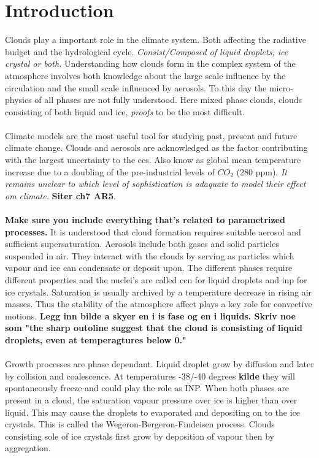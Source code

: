 \chapter{Introduction} \label{ch:introduction}
Clouds play a important role in the climate system. Both affecting the radiative budget and the hydrological cycle. \textit{Consist/Composed of liquid droplets, ice crystal or both.} Understanding how clouds form in the complex system of the atmosphere involves both knowledge about the large scale influence by the circulation and the small scale influenced by aerosols. To this day the micro-physics of all phases are not fully understood. Here mixed phase clouds, clouds consisting of both liquid and ice, \textit{proofs} to be the most difficult. 
\\ \\ 
Climate models are the most useful tool for studying past, present and future climate change. Clouds and aerosols are acknowledged as the factor contributing with the largest uncertainty to the \acrfull{ecs}. Also know as global mean temperature increase due to a doubling of the pre-industrial levels of $CO_2$ (280 \acrshort{ppm}). \textit{It remains unclear to which level of sophistication is adaquate to model their effect om climate.} \textbf{Siter ch7 AR5}.
\\ \\
\textbf{Make sure you include everything that's related to parametrized processes.} It is understood that cloud formation requires suitable aerosol and sufficient supersaturation. Aerosols include both gases and solid particles suspended in air. They interact with the clouds by serving as particles which vapour and ice can condensate or deposit upon. The different phases require different properties and the nuclei's are called \acrshort{ccn} for liquid droplets and \acrshort{inp} for ice crystals. Saturation is usually archived by a temperature decrease in rising air masses. Thus the stability of the atmosphere affect plays a key role for convective motions.
\textbf{Legg inn bilde a skyer en i is fase og en i liquids. Skriv noe som "the sharp outoline suggest that the cloud is consisting of liquid droplets, even at temperagtures below 0."}
\\ \\ 
Growth processes are phase dependant. Liquid droplet grow by diffusion and later by collision and coalescence. At temperatures -38/-40 degrees \textbf{kilde} they will spontaneously freeze and could play the role as INP. When both phases are present in a cloud, the saturation vapour pressure over ice is higher than over liquid. This may cause the droplets to evaporated and depositing on to the ice crystals. This is called the Wegeron-Bergeron-Findeisen process. Clouds consisting sole of ice crystals first grow by deposition of vapour then by aggregation. 
